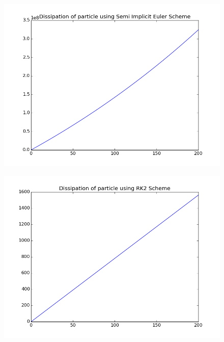 \documentclass[11pt, a4paper]{article}
\begin{document}
\begin{figure}[H]
 \centering
 \includegraphics[width = \textwidth]{q1_dissipation_euler2.png}
\end{figure}
\begin{figure}[H]
 \centering
 \includegraphics[width = \textwidth]{q1_dissipation_RK2.png}
\end{figure}
\end{document}
